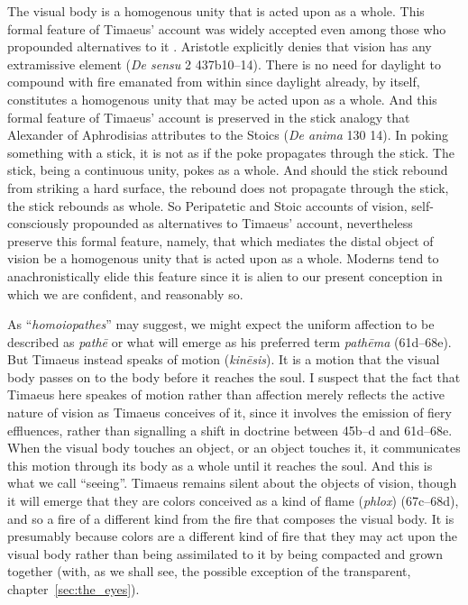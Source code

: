 The visual body is a homogenous unity that is acted upon as a whole. This formal feature of Timaeus' account was widely accepted even among those who propounded alternatives to it \cite[chapter 1]{Lindberg:1977aa}. Aristotle explicitly denies that vision has any extramissive element (\emph{De sensu} 2 437b10--14). There is no need for daylight to compound with fire emanated from within since daylight already, by itself, constitutes a homogenous unity that may be acted upon as a whole. And this formal feature of Timaeus' account is preserved in the stick analogy that Alexander of Aphrodisias attributes to the Stoics (\emph{De anima} 130 14). In poking something with a stick, it is not as if the poke propagates through the stick. The stick, being a continuous unity, pokes as a whole. And should the stick rebound from striking a hard surface, the rebound does not propagate through the stick, the stick rebounds as whole. So Peripatetic and Stoic accounts of vision, self-consciously propounded as alternatives to Timaeus' account, nevertheless preserve this formal feature, namely, that which mediates the distal object of vision be a homogenous unity that is acted upon as a whole. Moderns tend to anachronistically elide this feature since it is alien to our present conception in which we are confident, and reasonably so.

As ``\emph{homoiopathes}'' may suggest, we might expect the uniform affection to be described as \emph{pathē} or what will emerge as his preferred term \emph{pathēma} (61d--68e). But Timae\-us instead speaks of motion (\emph{kinēsis}). It is a motion that the visual body passes on to the body before it reaches the soul. I suspect that the fact that Timaeus here speakes of motion rather than affection merely reflects the active nature of vision as Timaeus conceives of it, since it involves the emission of fiery effluences, rather than signalling a shift in doctrine between 45b--d and 61d--68e. When the visual body touches an object, or an object touches it, it communicates this motion through its body as a whole until it reaches the soul. And this is what we call ``seeing''. Timaeus remains silent about the objects of vision, though it will emerge that they are colors conceived as a kind of flame (\emph{phlox}) (67c–68d), and so a fire of a different kind from the fire that composes the visual body. It is presumably because colors are a different kind of fire that they may act upon the visual body rather than being assimilated to it by being compacted and grown together (with, as we shall see, the possible exception of the transparent, chapter~\ref{sec:the_eyes}).

